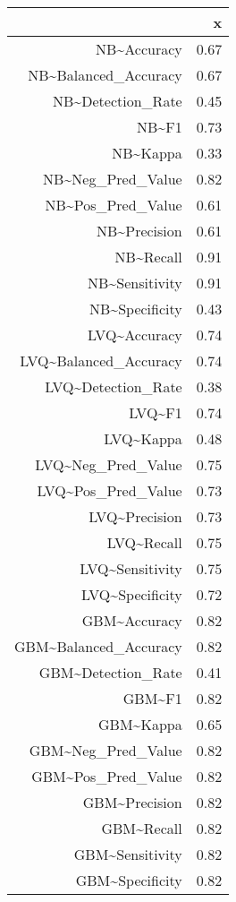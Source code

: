\begin{table}[ht]
\centering
\begin{tabular}{rr}
  \hline
 & x \\ 
  \hline
NB\~{}Accuracy & 0.67 \\ 
  NB\~{}Balanced\_Accuracy & 0.67 \\ 
  NB\~{}Detection\_Rate & 0.45 \\ 
  NB\~{}F1 & 0.73 \\ 
  NB\~{}Kappa & 0.33 \\ 
  NB\~{}Neg\_Pred\_Value & 0.82 \\ 
  NB\~{}Pos\_Pred\_Value & 0.61 \\ 
  NB\~{}Precision & 0.61 \\ 
  NB\~{}Recall & 0.91 \\ 
  NB\~{}Sensitivity & 0.91 \\ 
  NB\~{}Specificity & 0.43 \\ 
  LVQ\~{}Accuracy & 0.74 \\ 
  LVQ\~{}Balanced\_Accuracy & 0.74 \\ 
  LVQ\~{}Detection\_Rate & 0.38 \\ 
  LVQ\~{}F1 & 0.74 \\ 
  LVQ\~{}Kappa & 0.48 \\ 
  LVQ\~{}Neg\_Pred\_Value & 0.75 \\ 
  LVQ\~{}Pos\_Pred\_Value & 0.73 \\ 
  LVQ\~{}Precision & 0.73 \\ 
  LVQ\~{}Recall & 0.75 \\ 
  LVQ\~{}Sensitivity & 0.75 \\ 
  LVQ\~{}Specificity & 0.72 \\ 
  GBM\~{}Accuracy & 0.82 \\ 
  GBM\~{}Balanced\_Accuracy & 0.82 \\ 
  GBM\~{}Detection\_Rate & 0.41 \\ 
  GBM\~{}F1 & 0.82 \\ 
  GBM\~{}Kappa & 0.65 \\ 
  GBM\~{}Neg\_Pred\_Value & 0.82 \\ 
  GBM\~{}Pos\_Pred\_Value & 0.82 \\ 
  GBM\~{}Precision & 0.82 \\ 
  GBM\~{}Recall & 0.82 \\ 
  GBM\~{}Sensitivity & 0.82 \\ 
  GBM\~{}Specificity & 0.82 \\ 

\end{tabular}
\end{table}
